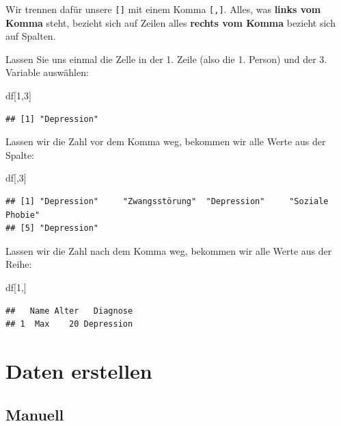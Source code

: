\documentclass[
]{book}
\newenvironment{Shaded}{\begin{snugshade}}{\end{snugshade}}
\newcommand{\DecValTok}[1]{\textcolor[rgb]{0.00,0.00,0.81}{#1}}
\newcommand{\NormalTok}[1]{#1}
\begin{document}
Wir trennen dafür unsere \texttt{{[}{]}} mit einem Komma \texttt{{[},{]}}. Alles, was \textbf{links vom Komma} steht, bezieht sich auf Zeilen alles \textbf{rechts vom Komma} bezieht sich auf Spalten.

Lassen Sie uns einmal die Zelle in der 1. Zeile (also die 1. Person) und der 3. Variable auswählen:

\begin{Shaded}
\begin{Highlighting}[]
\NormalTok{df[}\DecValTok{1}\NormalTok{,}\DecValTok{3}\NormalTok{]}
\end{Highlighting}
\end{Shaded}

\begin{verbatim}
## [1] "Depression"
\end{verbatim}

Lassen wir die Zahl vor dem Komma weg, bekommen wir alle Werte aus der Spalte:

\begin{Shaded}
\begin{Highlighting}[]
\NormalTok{df[,}\DecValTok{3}\NormalTok{]}
\end{Highlighting}
\end{Shaded}

\begin{verbatim}
## [1] "Depression"     "Zwangsstörung"  "Depression"     "Soziale Phobie"
## [5] "Depression"
\end{verbatim}

Lassen wir die Zahl nach dem Komma weg, bekommen wir alle Werte aus der Reihe:

\begin{Shaded}
\begin{Highlighting}[]
\NormalTok{df[}\DecValTok{1}\NormalTok{,]}
\end{Highlighting}
\end{Shaded}

\begin{verbatim}
##   Name Alter   Diagnose
## 1  Max    20 Depression
\end{verbatim}

\chapter{Daten erstellen}\label{daten-erstellen}

\section{Manuell}\label{manuell}
\end{document}
